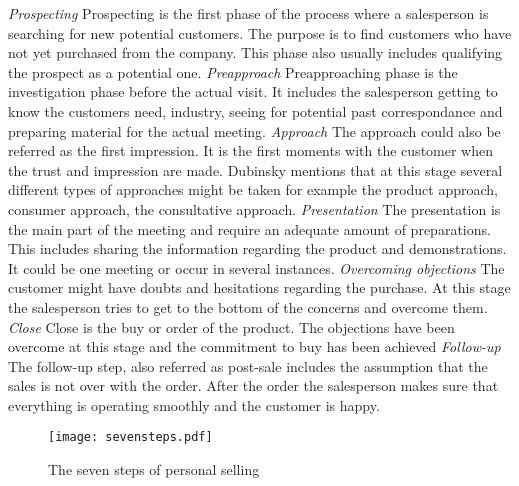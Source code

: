 \documentclass[12pt,a4paper,oneside,pdftex]{report}
\begin{document}
{{\newline \newline \emph{Prospecting}\newline 
Prospecting is the first phase of the process where a salesperson is searching for new potential customers. The purpose is to find customers who have not yet purchased from the company. This phase also usually includes qualifying the prospect as a potential one. \citep{Jobber}\newline \newline
\emph{Preapproach}\newline 
Preapproaching phase is the investigation phase before the actual visit. It includes the salesperson getting to know the customers need, industry, seeing for potential past correspondance and preparing material for the actual meeting. \citep{Moncrief}\newline \newline
\emph{Approach}\newline
The approach could also be referred as the first impression. It is the first moments with the customer when the trust and impression are made. Dubinsky mentions that at this stage several different types of approaches might be taken for example the product approach, consumer approach, the consultative approach. \citep{Dubinsky} \newline \newline
\emph{Presentation}\newline
The presentation is the main part of the meeting and require an adequate amount of preparations. This includes sharing the information regarding the product and demonstrations. It could be one meeting or occur in several instances. \citep{Moncrief}\newline \newline
\emph{Overcoming objections}\newline
The customer might have doubts and hesitations regarding the purchase. At this stage the salesperson tries to get to the bottom of the concerns and overcome them. \citep{Moncrief}\newline \newline
\emph{Close}\newline
Close is the buy or order of the product. The objections have been overcome at this stage and the commitment to buy has been achieved \citep{Moncrief} \newline \newline
\emph{Follow-up}\newline
The follow-up step, also referred as post-sale includes the assumption that the sales is not over with the order. After the order the salesperson makes sure that everything is operating smoothly and the customer is happy. \citep{Dubinsky}
\newline 
\begin{figure}[ht]
  \begin{center}
    \texttt{[image: sevensteps.pdf]}
    \caption{The seven steps of personal selling}
    \label{fig:seven}
  \end{center}
\end{figure}
}}
\end{document}
